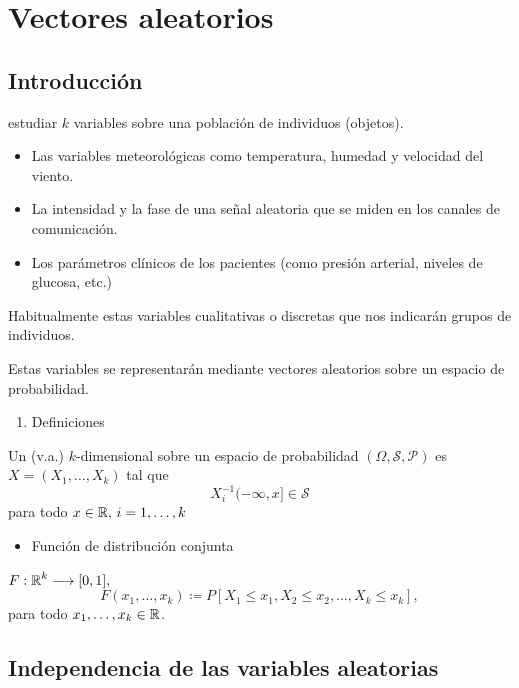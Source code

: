 \section{Vectores aleatorios}

\subsection{Introducción}

estudiar $k$ variables sobre una población de individuos (objetos).

\begin{itemize}[label=$\to$]
\item Las variables meteorológicas como temperatura, humedad y velocidad del viento.
\item La intensidad y la fase de una señal aleatoria que se miden en los canales de comunicación.
\item Los parámetros clínicos de los pacientes (como presión arterial, niveles de glucosa, etc.)
\end{itemize}
Habitualmente estas variables cualitativas o discretas que nos indicarán grupos de individuos.

Estas variables se representarán mediante vectores aleatorios sobre un espacio de probabilidad.

\begin{enumerate}[label=\arabic*)]
	\item Definiciones
\end{enumerate}

Un  (v.a.) $k$-dimensional sobre un espacio de probabilidad $(\Omega,\mathcal{S},\mathcal{P})$ es $X=(X_1,\dots,X_k)$ tal que \[ X_i^{-1}(-\infty,x]\in\mathcal{S} \]para todo $x\in\operatorname{\mathbb{R}},\, i=1,\dots,k$

\begin{itemize}[label=\color{red}\textbullet, leftmargin=*]
	\item \color{lightblue}Función de distribución conjunta
\end{itemize}

$F:\operatorname{\mathbb{R}}^k\longrightarrow[0,1],$\[ F(x_1,\dots,x_k)\coloneq P[X_1\le x_1,X_2\le x_2,\dots,X_k\le x_k], \] para todo $x_1,\dots,x_k\in\operatorname{\mathbb{R}}$.

\subsection{Independencia de las variables aleatorias}

